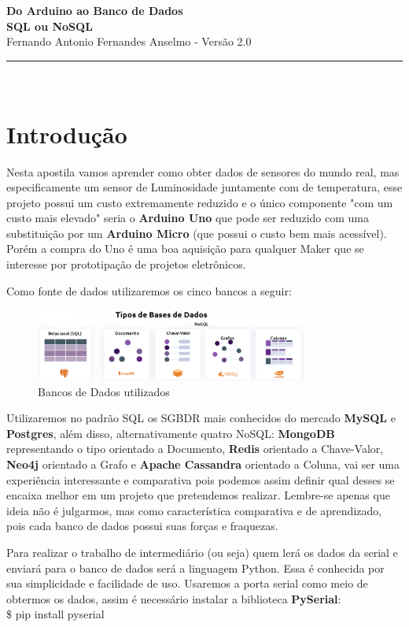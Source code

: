 \documentclass[a4paper,11pt]{article}
\newcommand{\rttitulo}{Do Arduino ao Banco de Dados \\ SQL ou NoSQL}
\begin{document}
\thispagestyle{firstpage}
\begin{center}
	\hfill \break
	{ \huge \bfseries \rttitulo} \\[0.2 cm]
	Fernando Antonio Fernandes Anselmo - Versão 2.0
	\rule{\linewidth}{0.2 mm} \\[0.4 cm]
\end{center}

\section*{Introdução}
Nesta apostila vamos aprender como obter dados de sensores do mundo real, mas especificamente um sensor de Luminosidade juntamente com de temperatura, esse projeto possui um custo extremamente reduzido e o único componente "com um custo mais elevado" seria o \textbf{Arduino Uno} que pode ser reduzido com uma substituição por um \textbf{Arduino Micro} (que possui o custo bem mais acessível). Porém a compra do Uno é uma boa aquisição para qualquer Maker que se interesse por prototipação de projetos eletrônicos.

Como fonte de dados utilizaremos os cinco bancos a seguir:
\begin{figure}[H]
	\centering
	\includegraphics[width=0.8\textwidth]{images/NoSQL}
	\caption{Bancos de Dados utilizados}
\end{figure}

Utilizaremos no padrão SQL os SGBDR mais conhecidos do mercado \textbf{MySQL} e \textbf{Postgres}, além disso, alternativamente quatro NoSQL: \textbf{MongoDB} representando o tipo orientado a Documento, \textbf{Redis} orientado a Chave-Valor, \textbf{Neo4j} orientado a Grafo e \textbf{Apache Cassandra} orientado a Coluna, vai ser uma experiência interessante e comparativa pois podemos assim definir qual desses se encaixa melhor em um projeto que pretendemos realizar. Lembre-se apenas que ideia não é julgarmos, mas como característica comparativa e de aprendizado, pois cada banco de dados possui suas forças e fraquezas.

Para realizar o trabalho de intermediário (ou seja) quem lerá os dados da serial e enviará para o banco de dados será a linguagem Python. Essa é conhecida por sua simplicidade e facilidade de uso. Usaremos a porta serial como meio de obtermos os dados, assim é necessário instalar a biblioteca \textbf{PySerial}: \\
{\ttfamily\$ pip install pyserial}
\end{document}

